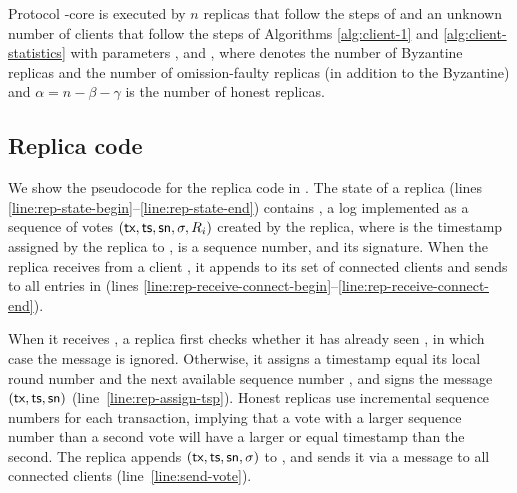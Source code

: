 

\begin{protocol}\label{const:pod-core}
     Protocol \podtm-core is executed by $n$ replicas that follow the steps of  and an unknown number of clients that follow the steps of Algorithms \ref{alg:client-1} and \ref{alg:client-statistics} with parameters \beta, \gamma and \alpha, where \beta denotes the number of Byzantine replicas and \gamma the number of omission-faulty replicas (in addition to the Byzantine) and $\alpha = n - \beta - \gamma$ is the number of honest replicas.
\end{protocol}


\subsection{Replica code}



We show the pseudocode for the replica code in .
The state of a replica (lines \ref{line:rep-state-begin}--\ref{line:rep-state-end}) contains \repLog, a log implemented as a sequence of votes $(\textsf{tx}, \textsf{ts}, \textsf{sn}, \sigma, R_i)$ created by the replica, where \tsp is the timestamp assigned by the replica to \tx, \sn is a sequence number, and \sig its signature.
When the replica receives \msgconnect{} from a client \client, it appends \client to its set of connected clients and sends to \client all entries in \repLog (lines \ref{line:rep-receive-connect-begin}--\ref{line:rep-receive-connect-end}).

When it receives  \msgwrite{\tx}, a replica first checks whether it has already seen \tx, in which case the message is ignored. Otherwise, it assigns \tx a timestamp \tsp equal its local round number and the next available sequence number \sn, and signs the message $(\textsf{tx}, \textsf{ts}, \textsf{sn})$ (line~\ref{line:rep-assign-tsp}).
Honest replicas use incremental sequence numbers for each transaction, implying that a vote with a larger sequence number than a second vote will have a larger or equal timestamp than the second.
The replica appends $(\textsf{tx}, \textsf{ts}, \textsf{sn}, \sigma)$ to \repLog, and sends it via a  message to all connected clients (line~\ref{line:send-vote}).

